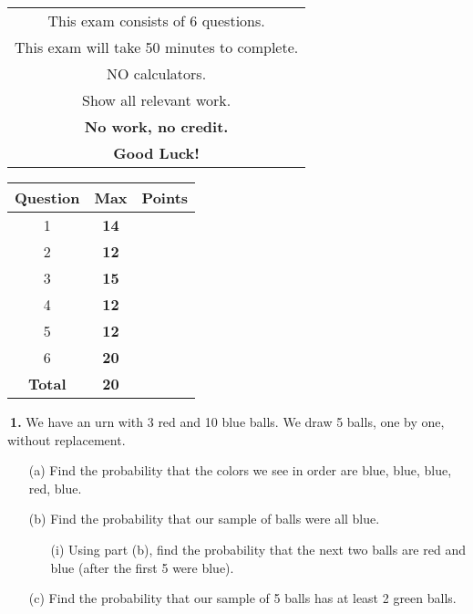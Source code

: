 \documentclass[12pt]{report}
\begin{document}
\begin{minipage}[b]{80mm}
\begin{tabular}{c}
\noindent This exam consists of 6 questions. \\

\noindent This exam will take 50 minutes to complete. \\

\noindent NO calculators.\\

\noindent Show all relevant work.\\
\noindent \textbf{No work, no credit.}\\

\noindent \textbf{Good Luck!}\\
\end{tabular}
\end{minipage}
\begin{minipage}[b]{80mm}
\begin{tabular}{ |c|c|c| }
	\hline
	\textbf{Question} & \textbf{Max} & \textbf{Points} \\
	\hline
	\hline
	1& \textbf{14} & \\
	\hline
	2& \textbf{12} & \\
	\hline
	3& \textbf{15} & \\
	\hline
	4& \textbf{12} & \\
	\hline
	5& \textbf{12} & \\
	\hline
	6& \textbf{20} & \\
	\hline
	\hline
	\textbf{Total} & \textbf{20} & \\
	\hline
\end{tabular}
\end{minipage}

\pagebreak








\noindent {} $~$\textbf{1.} We have an urn with 3 red and 10 blue balls. We draw 5 balls, one by one, without replacement. 
\begin{itemize}
\item [(a)] Find the probability that the colors we see in order are blue, blue, blue, red, blue.		%
\item [(b)] Find the probability that our sample of balls were all blue.					%
	\begin{itemize}
	\item [(i)] Using part (b), find the probability that the next two balls are red and blue (after the first 5 were blue).   %
	\end{itemize}
\item [(c)]  Find the probability that our sample of 5 balls has at least 2 green balls. 		%
\end{itemize}
\pagebreak
\end{document}
